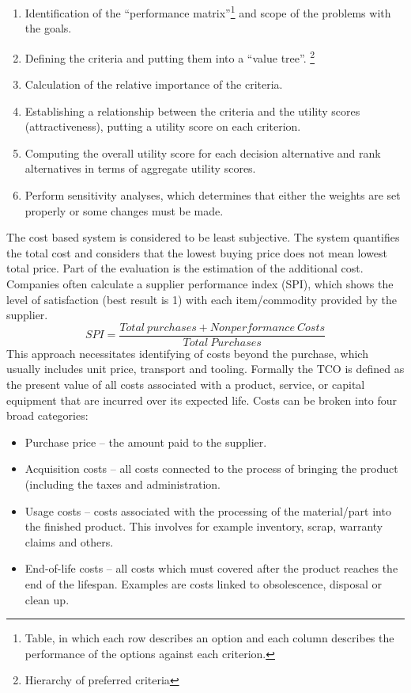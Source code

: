 \documentclass[oneside,12pt]{article}%
\begin{document}
\begin{enumerate}
  \item Identification of the ``performance matrix''\footnote{Table, in which each row describes an option and each column describes the performance of the options against each criterion.} and scope of the problems with the goals.
  \item Defining the criteria and putting them into a ``value tree''. \footnote{Hierarchy of preferred criteria}
  \item Calculation of the relative importance of the criteria.
  \item Establishing a relationship between the criteria and the utility scores (attractiveness), putting a utility score on each criterion.
  \item Computing the overall utility score for each decision alternative and rank alternatives in terms of aggregate utility scores.
  \item Perform sensitivity analyses, which determines that either the weights are set properly or some changes must be made.
\end{enumerate}


The cost based system is considered to be least subjective. The system quantifies the total cost and considers that the lowest buying price does not mean lowest total price. Part of the evaluation is the estimation of the additional cost. Companies often calculate a supplier performance index (SPI), which shows the level of satisfaction (best result is 1) with each item/commodity provided by the supplier.
\newline
$$SPI = \frac{Total \: purchases + Nonperformance \: Costs}{Total \: Purchases}$$
\newline
This approach necessitates identifying of costs beyond the purchase, which usually includes unit price, transport and tooling. Formally the TCO is defined as the present value of all costs associated with a product, service, or capital equipment that are incurred over its expected life. Costs can be broken into four broad categories:


\begin{itemize}
\item Purchase price – the amount paid to the supplier.
\item Acquisition costs – all costs connected to the process of bringing the product (including the taxes and administration.
\item Usage costs – costs associated with the processing of the material/part into the finished product. This involves for example inventory, scrap, warranty claims and others.
\item End-of-life costs – all costs which must covered after the product reaches the end of the lifespan. Examples are costs linked to obsolescence, disposal or clean up.
\end{itemize}
\end{document}
